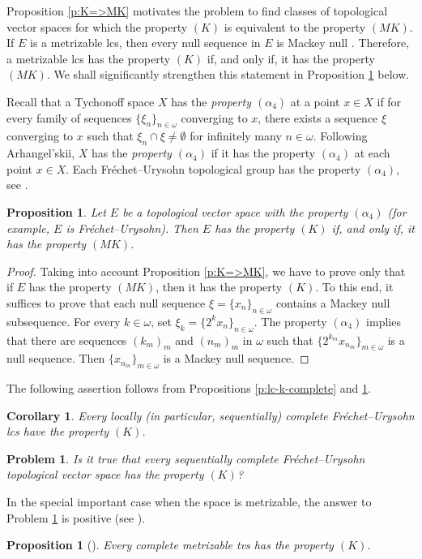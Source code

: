 \documentclass[preprint,11pt]{elsarticle}
\newtheorem{corollary}[theorem]{Corollary}
\newtheorem{proposition}[theorem]{Proposition}
\newtheorem{problem}[theorem]{Problem}
\theoremstyle{definition}
\theoremstyle{remark}
\numberwithin{equation}{section}
\numberwithin{theorem}{section}
\newcommand{\w}{\omega}
\begin{document}
Proposition \ref{p:K=>MK} motivates the problem to find classes of topological vector spaces for which the property $(K)$ is equivalent to the property $(MK)$. If $E$ is a metrizable lcs, then every null sequence in $E$ is Mackey null \cite[Proposition 5.1.4]{PB}. Therefore, a metrizable lcs has the property $(K)$ if, and only if, it has the property $(MK)$. We shall significantly strengthen this statement in Proposition \ref{p:al4-MK=K} below.

Recall that a Tychonoff space $X$ has the {\em property $(\alpha_4)$} at a point $x\in X$  if for every family of sequences $\{\xi_n\}_{n\in\w}$ converging to $x$, there exists a sequence $\xi$ converging to $x$ such that $\xi_n\cap\xi\neq\emptyset$ for infinitely many $n\in\w$.
Following Arhangel'skii,  $X$ has the {\em property $(\alpha_4)$} if it has the property $(\alpha_4)$ at each point $x\in X$.
Each Fr\'{e}chet--Urysohn topological group has the property $(\alpha_4)$, see \cite[Theorem 4]{Nyikos1981}.


\begin{proposition} \label{p:al4-MK=K}
Let $E$ be a topological vector space with the property $(\alpha_4)$ {\rm(}for example, $E$ is Fr\'{e}chet--Urysohn{\rm)}. Then $E$ has the property $(K)$ if, and only if, it has the property $(MK)$.
\end{proposition}

\begin{proof}
Taking into account Proposition \ref{p:K=>MK}, we have to prove only that if $E$ has the property $(MK)$, then it has  the property $(K)$. To this end, it suffices to prove that each null sequence $\xi=\{x_n\}_{n\in\w}$ contains a Mackey null subsequence. For every $k\in\w$, set $\xi_k=\{ 2^k x_n\}_{n\in \w}$. The property $(\alpha_4)$ implies that there are sequences $(k_m)_m$ and $(n_m)_m$ in $\w$ such that $\{2^{k_m} x_{n_m}\}_{m\in \w}$ is a null sequence. Then $\{x_{n_m}\}_{m\in \w}$ is a Mackey null sequence.
\end{proof}


The following assertion follows from Propositions \ref{p:lc-k-complete} and \ref{p:al4-MK=K}.
%
\begin{corollary} \label{c:FU+sc=>K}
Every locally {\rm(}in particular, sequentially{\rm)} complete Fr\'{e}chet--Urysohn lcs have the property $(K)$.
\end{corollary}


\begin{problem}\label{prob:FU+sc=>K}
Is it true that every sequentially complete Fr\'{e}chet--Urysohn topological vector space has the property $(K)$?
\end{problem}
%
In the special important case when the space is metrizable, the answer to Problem \ref{prob:FU+sc=>K} is positive (see \cite[Observation 1.2.16(a)]{PB}).
\begin{proposition}[\cite{PB}] \label{p:metr+c=>K}
Every  complete metrizable tvs has the property $(K)$.
\end{proposition}
\end{document}
